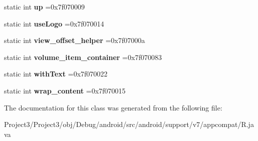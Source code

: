 \begin{DoxyCompactItemize}
static int {\bfseries up} =0x7f070009
\item 
\mbox{\label{classandroid_1_1support_1_1v7_1_1appcompat_1_1R_1_1id_afe7229246bbe6c8c8d1d2d10cd0ab6d2}} 
static int {\bfseries use\+Logo} =0x7f070014
\item 
\mbox{\label{classandroid_1_1support_1_1v7_1_1appcompat_1_1R_1_1id_a4b155382233970882cc9073a73705ed1}} 
static int {\bfseries view\+\_\+offset\+\_\+helper} =0x7f07000a
\item 
\mbox{\label{classandroid_1_1support_1_1v7_1_1appcompat_1_1R_1_1id_ac87a4034ec8c9a78659012ecd6d282b0}} 
static int {\bfseries volume\+\_\+item\+\_\+container} =0x7f070083
\item 
\mbox{\label{classandroid_1_1support_1_1v7_1_1appcompat_1_1R_1_1id_aa5dcf3ee3c29cc9ae9aa563a81723acb}} 
static int {\bfseries with\+Text} =0x7f070022
\item 
\mbox{\label{classandroid_1_1support_1_1v7_1_1appcompat_1_1R_1_1id_a9df9c86c1cdda33d7be9954ddbee408e}} 
static int {\bfseries wrap\+\_\+content} =0x7f070015
\end{DoxyCompactItemize}


The documentation for this class was generated from the following file\+:\begin{DoxyCompactItemize}
\item 
Project3/\+Project3/obj/\+Debug/android/src/android/support/v7/appcompat/R.\+java\end{DoxyCompactItemize}
